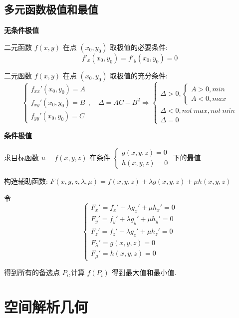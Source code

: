 \section{多元函数极值和最值}
\textbf{无条件极值}
\begin{definition}[多元函数极值]
	二元函数 $f(x,y)$ 在点 $(x_{0},y_{0})$ 取极值的必要条件: 
	$$f'_{x}(x_{0},y_{0})=f'_{y}(x_{0},y_{0})=0$$
	
	二元函数 $f(x,y)$ 在点 $(x_{0},y_{0})$ 取极值的充分条件: 
	$$\left\lbrace\begin{array}{l}
		f_{xx}'(x_{0},y_{0})=A\\
		f_{xy}'(x_{0},y_{0})=B\\
		f_{yy}'(x_{0},y_{0})=C
	\end{array} \right.  ,\quad \Delta=AC-B^2\Rightarrow \left\lbrace\begin{array}{l}
		\Delta>0,\left\lbrace\begin{array}{l}
			A>0,min\\A<0,max
		\end{array} \right.\\
		\Delta<0,not \ max,not \ min\\ 
		\Delta=0
	\end{array} \right.$$
\end{definition}
\textbf{条件极值}
\begin{definition}[拉格朗日数乘法]
	
	求目标函数 $u=f(x,y,z)$ 在条件 $\left\lbrace \begin{array}{l}
		g(x,y,z)=0\\h(x,y,z)=0
	\end{array}\right.$ 下的最值
	
	构造辅助函数:  $F(x,y,z,\lambda,\mu)=f(x,y,z)+\lambda g(x,y,z)+\mu h(x,y,z)$
	
	令 $$\left\lbrace \begin{array}{c}
		F_{x}'=f_{x}'+\lambda g_{x}'+\mu h_{x}'=0\\
		F_{y}'=f_{y}'+\lambda g_{y}'+\mu h_{y}'=0\\
		F_{z}'=f_{z}'+\lambda g_{z}'+\mu h_{z}'=0\\
		F_{\lambda}'= g(x,y,z)=0\\
		F_{\mu}'= h(x,y,z)=0
	\end{array}\right. $$
	
	得到所有的备选点 $P_{i}$,计算 $f(P_{i})$ 得到最大值和最小值.
\end{definition}	
\chapter{空间解析几何}
